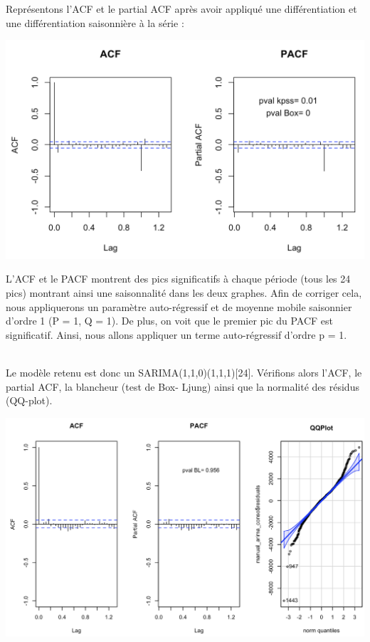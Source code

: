 \documentclass{article}
\theoremstyle{definition}
\theoremstyle{remark}
\begin{document}
Représentons l'ACF et le partial ACF après avoir appliqué une différentiation et une différentiation saisonnière à la série :
\FloatBarrier
\begin{minipage}{.5\textwidth}
\hspace{-1cm}
\includegraphics[width=0.95\linewidth]{fig9.png}
    \label{fig:enter-label}
\end{minipage}
\begin{minipage}{.5\textwidth}
    L’ACF et le PACF montrent des pics significatifs à chaque période (tous les 24 pics) montrant ainsi
    une saisonnalité dans les deux graphes. Afin de corriger cela, nous appliquerons un paramètre auto-régressif et de moyenne mobile saisonnier d’ordre 1 (P = 1, Q = 1).\newline
    De plus, on voit que le premier pic du PACF est significatif. Ainsi, nous allons appliquer un terme auto-régressif d’ordre p = 1.\newline\\    
\end{minipage}
\newline
\\
Le modèle retenu est donc un SARIMA(1,1,0)(1,1,1)[24].\newline
Vérifions alors l’ACF, le partial ACF, la blancheur (test de Box-
Ljung) ainsi que la normalité des résidus (QQ-plot).\newline
\FloatBarrier
\begin{minipage}{.5\textwidth}
\hspace{-1cm}
\includegraphics[width=0.95\linewidth]{fig10.png}
    \label{fig:enter-label}
\end{minipage}
\end{document}

